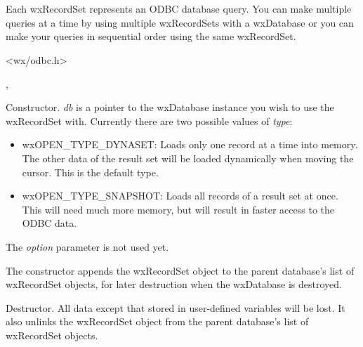 \section{}\label{wxrecordset}

Each wxRecordSet represents an ODBC database query. You can make multiple queries
at a time by using multiple wxRecordSets with a wxDatabase or you can make
your queries in sequential order using the same wxRecordSet.




<wx/odbc.h>


, 




Constructor. {\it db} is a pointer to the wxDatabase instance you wish to use the
wxRecordSet with. Currently there are two possible values of {\it type}:

\begin{itemize}\itemsep=0pt
\item wxOPEN\_TYPE\_DYNASET: Loads only one record at a time into memory. The other
data of the result set will be loaded dynamically when
moving the cursor. This is the default type.
\item wxOPEN\_TYPE\_SNAPSHOT: Loads all records of a result set at once. This will
need much more memory, but will result in
faster access to the ODBC data.
\end{itemize}

The {\it option} parameter is not used yet.

The constructor appends the wxRecordSet object to the parent database's list of
wxRecordSet objects, for later destruction when the wxDatabase is destroyed.



Destructor. All data except that stored in user-defined variables will be lost.
It also unlinks the wxRecordSet object from the parent database's list of
wxRecordSet objects.
 
